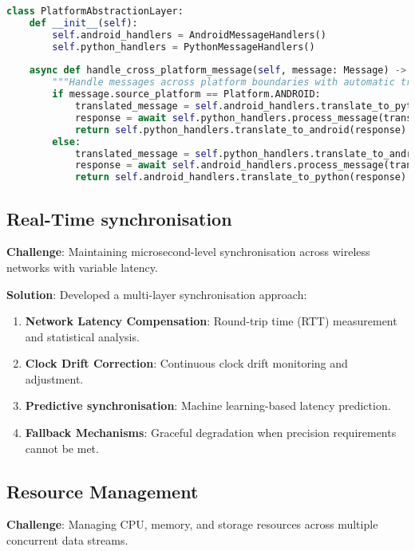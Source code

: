\documentclass[11pt,a4paper]{report}
\begin{document}
\begin{lstlisting}[language=Python]
class PlatformAbstractionLayer:
    def __init__(self):
        self.android_handlers = AndroidMessageHandlers()
        self.python_handlers = PythonMessageHandlers()
        
    async def handle_cross_platform_message(self, message: Message) -> Response:
        """Handle messages across platform boundaries with automatic translation."""
        if message.source_platform == Platform.ANDROID:
            translated_message = self.android_handlers.translate_to_python(message)
            response = await self.python_handlers.process_message(translated_message)
            return self.python_handlers.translate_to_android(response)
        else:
            translated_message = self.python_handlers.translate_to_android(message)
            response = await self.android_handlers.process_message(translated_message)
            return self.android_handlers.translate_to_python(response)
\end{lstlisting}

\subsection{Real-Time synchronisation}

\textbf{Challenge}: Maintaining microsecond-level synchronisation across wireless networks with variable latency.

\textbf{Solution}: Developed a multi-layer synchronisation approach:
\begin{enumerate}
  \item \textbf{Network Latency Compensation}: Round-trip time (RTT) measurement and statistical analysis.
  \item \textbf{Clock Drift Correction}: Continuous clock drift monitoring and adjustment.
  \item \textbf{Predictive synchronisation}: Machine learning-based latency prediction.
  \item \textbf{Fallback Mechanisms}: Graceful degradation when precision requirements cannot be met.
\end{enumerate}

\subsection{Resource Management}

\textbf{Challenge}: Managing CPU, memory, and storage resources across multiple concurrent data streams.
\end{document}
